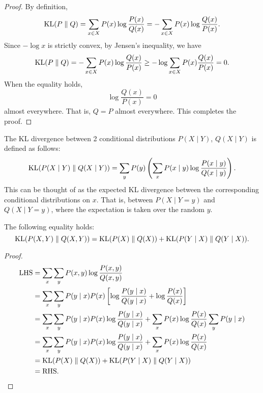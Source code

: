 \documentclass[a4paper]{article}
\begin{document}
\begin{proof}
  By definition,
  \[
    \operatorname{KL}(P \; \Vert \; Q) = \sum_{x \in X} P(x) \log \frac{P(x)}{Q(x)} = - \sum_{x \in X} P(x) \log \frac{Q(x)}{P(x)}.
  \]
  Since $-\log x$ is strictly convex, by Jensen's inequality, we have
  \[
  \begin{aligned}
    \operatorname{KL}(P \; \Vert \; Q) = - \sum_{x \in X} P(x) \log \frac{Q(x)}{P(x)}
    \geq -\log \sum_{x \in X} P(x) \frac{Q(x)}{P(x)} = 0.
  \end{aligned}
  \]
  When the equality holds,
  \[
  \log \frac{Q(x)}{P(x)} = 0
  \]
  almost everywhere.
  That is, $Q = P$ almost everywhere.
  This completes the proof.
\end{proof}

\begin{defi}
  The KL divergence between 2 conditional distributions
  $P(X \mid Y)$, $Q(X \mid Y)$ is defined as follows:
  \[
  \operatorname{KL}({P(X \mid Y)} \; \Vert \; {Q(X \mid Y)}) = \sum_y P(y)
  \left( \sum_x P(x \mid y) \log
  \frac{P(x \mid y)}{Q(x \mid y)} \right).
  \]
  This can be thought of as the expected KL divergence
  between the corresponding conditional distributions on
  $x$. That is, between $P(X \mid Y = y)$ and $Q(X \mid Y = y)$,
  where the expectation is taken over the random $y$.
\end{defi}

\begin{thm}
The following equality holds:
\[
\operatorname{KL}({P(X, Y)} \; \Vert \; {Q(X, Y)}) =
\operatorname{KL}({P(X)} \; \Vert \; {Q(X)}) + \operatorname{KL}({P(Y \mid X)}
\; \Vert \; {Q(Y \mid X)}).
\]
\end{thm}

\begin{proof}
\[
\begin{aligned}
  \text{LHS} &= \sum_x \sum_y P(x,y) \log \frac{P(x,y)}{Q(x,y)} \\
  &= \sum_x \sum_y P(y \mid x) P(x) \left[ \log
  \frac{P(y \mid x)}{Q(y \mid x)} + \log \frac{P(x)}{Q(x)} \right] \\
  &= \sum_x \sum_y P(y \mid x) P(x) \log
  \frac{P(y \mid x)}{Q(y \mid x)} + \sum_x P(x) \log
  \frac{P(x)}{Q(x)} \sum_y P(y \mid x) \\
  &= \sum_x \sum_y P(y \mid x) P(x) \log \frac{P(y \mid x)}
  {Q(y \mid x)} + \sum_x P(x) \log \frac{P(x)}{Q(x)} \\
  &= \operatorname{KL}({P(X)} \; \Vert \; {Q(X)}) + \operatorname{KL}({P(Y \mid X)} \; \Vert \; {Q(Y \mid X)}) \\
  &= \text{RHS}.
\end{aligned}
\]
\end{proof}
\end{document}
